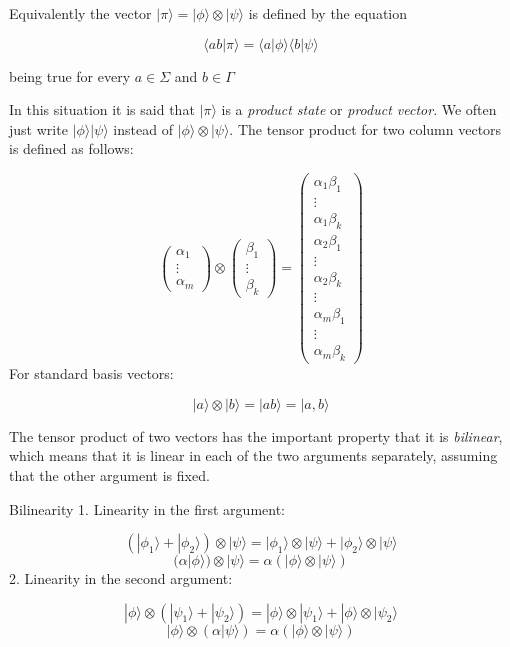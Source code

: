 \documentclass[svgnames]{article}     %
\begin{document}
Equivalently the vector $|\pi\rangle = |\phi\rangle \otimes |\psi\rangle $ is
defined by the equation 

\[
  \langle ab | \pi \rangle = \langle a | \phi \rangle \langle b | \psi \rangle
\] \vspace{5px}

being true for every $a\in \Sigma$ and $b\in\Gamma$

In this situation it is said that $|\pi\rangle$ is a \textit{product state} or
\textit{product vector}. We often just write $|\phi\rangle |\psi\rangle
$ instead of $|\phi\rangle \otimes |\psi\rangle $. The tensor product for two
column vectors is defined as follows: 

\[
\begin{pmatrix}
  \alpha_1 \\ \vdots \\ \alpha_m
\end{pmatrix} \otimes \begin{pmatrix}
  \beta_1 \\ \vdots \\ \beta_k 
\end{pmatrix} = \begin{pmatrix}
  \alpha_1\beta_1 \\ \vdots \\ \alpha_1\beta_k \\ \alpha_2 \beta_1 \\ \vdots \\
  \alpha_2 \beta_k \\ \vdots \\ \alpha_m \beta_1 \\ \vdots \\ \alpha_m \beta_k
\end{pmatrix} 
\] \vspace{5px}
For standard basis vectors: 

\[
  |a\rangle \otimes |b\rangle = |ab\rangle = |a, b\rangle
\] \vspace{5px}


The tensor product of two vectors has the important property that it is
\textit{bilinear}, which means that it is linear in each of the two arguments
separately, assuming that the other argument is fixed. 

\begin{mainbox}{Bilinearity}
  1. Linearity in the first argument: 

  \[
    (|\phi_1\rangle + |\phi_2\rangle) \otimes |\psi\rangle = |\phi_1\rangle
    \otimes |\psi\rangle + |\phi_2\rangle \otimes |\psi\rangle 
  \]\[
    ( \alpha | \phi \rangle) \otimes |\psi\rangle = \alpha (|\phi\rangle
    \otimes |\psi\rangle )
  \] 
  2. Linearity in the second argument: 

  \[
  |\phi\rangle \otimes (|\psi_1\rangle + |\psi_2\rangle ) = |\phi\rangle
\otimes |\psi_1\rangle  + |\phi\rangle \otimes |\psi_2\rangle \] \[
|\phi\rangle \otimes (\alpha |\psi\rangle) = \alpha(|\phi\rangle \otimes
|\psi\rangle )
\] 
\end{mainbox} 
\end{document}
